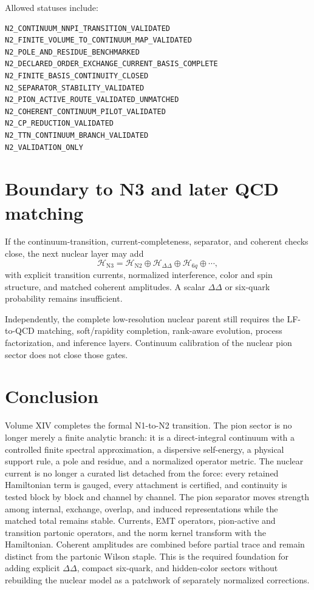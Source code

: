 \documentclass[11pt]{article}
\newcommand{\Hil}{\mathcal H}
\begin{document}
Allowed statuses include:
\begin{verbatim}
N2_CONTINUUM_NNPI_TRANSITION_VALIDATED
N2_FINITE_VOLUME_TO_CONTINUUM_MAP_VALIDATED
N2_POLE_AND_RESIDUE_BENCHMARKED
N2_DECLARED_ORDER_EXCHANGE_CURRENT_BASIS_COMPLETE
N2_FINITE_BASIS_CONTINUITY_CLOSED
N2_SEPARATOR_STABILITY_VALIDATED
N2_PION_ACTIVE_ROUTE_VALIDATED_UNMATCHED
N2_COHERENT_CONTINUUM_PILOT_VALIDATED
N2_CP_REDUCTION_VALIDATED
N2_TTN_CONTINUUM_BRANCH_VALIDATED
N2_VALIDATION_ONLY
\end{verbatim}

\section{Boundary to N3 and later QCD matching}
\label{sec:boundary}

If the continuum-transition, current-completeness, separator, and coherent
checks close, the next nuclear layer may add
\begin{equation}
 \Hil_{\mathrm{N3}}
 =\Hil_{\mathrm{N2}}
 \oplus\Hil_{\Delta\Delta}
 \oplus\Hil_{6q}
 \oplus\cdots,
 \label{eq:n3-space}
\end{equation}
with explicit transition currents, normalized interference, color and spin
structure, and matched coherent amplitudes.  A scalar \(\Delta\Delta\) or
six-quark probability remains insufficient.

Independently, the complete low-resolution nuclear parent still requires the
LF-to-QCD matching, soft/rapidity completion, rank-aware evolution, process
factorization, and inference layers.  Continuum calibration of the nuclear
pion sector does not close those gates.

\section{Conclusion}

Volume XIV completes the formal N1-to-N2 transition.  The pion sector is no
longer merely a finite analytic branch: it is a direct-integral continuum with
a controlled finite spectral approximation, a dispersive self-energy, a
physical support rule, a pole and residue, and a normalized operator metric.
The nuclear current is no longer a curated list detached from the force:
every retained Hamiltonian term is gauged, every attachment is certified, and
continuity is tested block by block and channel by channel.  The pion
separator moves strength among internal, exchange, overlap, and induced
representations while the matched total remains stable.  Currents, EMT
operators, pion-active and transition partonic operators, and the norm kernel
transform with the Hamiltonian.  Coherent amplitudes are combined before
partial trace and remain distinct from the partonic Wilson staple.  This is
the required foundation for adding explicit \(\Delta\Delta\), compact
six-quark, and hidden-color sectors without rebuilding the nuclear model as a
patchwork of separately normalized corrections.
\end{document}
